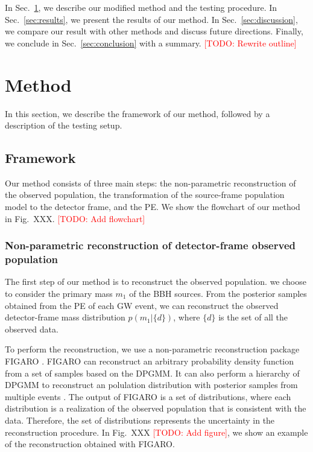 \documentclass[aps,prd,twocolumn,superscriptaddress,preprintnumbers,nofootinbib,hidelinks]{revtex4-2}
\newcommand{\todo}[1]{\textcolor{red}{[TODO: #1]}}
\begin{document}
In Sec.~\ref{sec:method}, we describe our modified method and the testing procedure.
In Sec.~\ref{sec:results}, we present the results of our method.
In Sec.~\ref{sec:discussion}, we compare our result with other methods and discuss future directions.
Finally, we conclude in Sec.~\ref{sec:conclusion} with a summary.
\todo{Rewrite outline}

\section{Method}
\label{sec:method}

In this section, we describe the framework of our method, followed by a description of the testing setup.

\subsection{Framework}
\label{sec:framework}

Our method consists of three main steps: the non-parametric reconstruction of the observed population, the transformation of the source-frame population model to the detector frame, and the \ac{PE}.
We show the flowchart of our method in Fig.~XXX. \todo{Add flowchart}

\subsubsection{Non-parametric reconstruction of detector-frame observed population}
\label{sec:reconstruction}

The first step of our method is to reconstruct the observed population.
we choose to consider the primary mass $m_1$ of the \ac{BBH} sources.
From the posterior samples obtained from the \ac{PE} of each \ac{GW} event, we can reconstruct the observed detector-frame mass distribution $p(m_1|\{d\})$, where $\{d\}$ is the set of all the observed data.

To perform the reconstruction, we use a non-parametric reconstruction package \textsc{FIGARO} \citep{Rinaldi:2022kyg}.
\textsc{FIGARO} can reconstruct an arbitrary probability density function from a set of samples based on the \ac{DPGMM}.
It can also perform a hierarchy of \ac{DPGMM} to reconstruct an polulation distribution with posterior samples from multiple events \citep{Rinaldi:2021bhm}.
The output of \textsc{FIGARO} is a set of distributions, where each distribution is a realization of the observed population that is consistent with the data.
Therefore, the set of distributions represents the uncertainty in the reconstruction procedure.
In Fig.~XXX \todo{Add figure}, we show an example of the reconstruction obtained with \textsc{FIGARO}.
\end{document}
